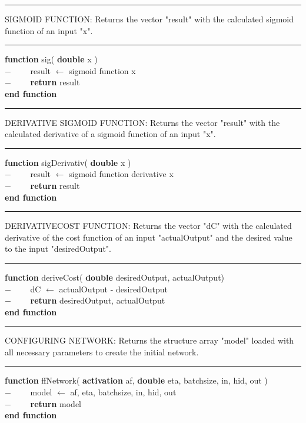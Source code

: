 \rule{\textwidth}{0.4pt}
SIGMOID FUNCTION: Returns the vector "result" with the calculated sigmoid function of an input "x".\\
\rule{\textwidth}{0.4pt}
\begin{addmargin}[2em]{0em}
\textbf{function} sig( \textbf{double} x )\\
    $- \qquad$ result $\leftarrow$ sigmoid function x \\
    $- \qquad$ \textbf{return} result\\
\textbf{end function}\\
\end{addmargin}
\rule{\textwidth}{0.4pt}
DERIVATIVE SIGMOID FUNCTION: Returns the vector "result" with the calculated derivative of a sigmoid function of an input "x".\\
\rule{\textwidth}{0.4pt}
\begin{addmargin}[2em]{0em}
\textbf{function} sigDerivativ( \textbf{double} x )\\
    $- \qquad$ result $\leftarrow$ sigmoid function derivative x \\
    $- \qquad$ \textbf{return} result\\
\textbf{end function}\\
\end{addmargin}
\rule{\textwidth}{0.4pt}
DERIVATIVECOST FUNCTION: Returns the vector "dC" with the calculated derivative of the cost function of an input "actualOutput" and the desired value to the input "desiredOutput".\\
\rule{\textwidth}{0.4pt}
\begin{addmargin}[2em]{0em}
\textbf{function} deriveCost( \textbf{double} desiredOutput, actualOutput)\\
    $- \qquad$ dC $\leftarrow$ actualOutput - desiredOutput \\
    $- \qquad$ \textbf{return} desiredOutput, actualOutput\\
\textbf{end function}\\
\end{addmargin}
\rule{\textwidth}{0.4pt}
CONFIGURING NETWORK: Returns the structure array "model" loaded with all necessary parameters to create the initial network.\\
\rule{\textwidth}{0.4pt}
\begin{addmargin}[2em]{0em}
\textbf{function} ffNetwork( \textbf{activation} af, \textbf{double} eta, batchsize, in, hid, out )\\
    $- \qquad$ model $\leftarrow$ af, eta, batchsize, in, hid, out \\
    $- \qquad$ \textbf{return} model\\
\textbf{end function}\\
\end{addmargin}
